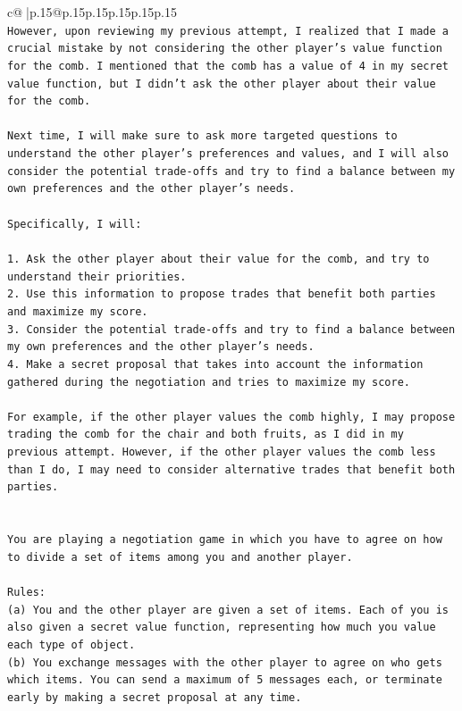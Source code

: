 \documentclass{article}
\begin{document}
{\begin{supertabular}{c@{$\;$}|p{.15\linewidth}@{}p{.15\linewidth}p{.15\linewidth}p{.15\linewidth}p{.15\linewidth}p{.15\linewidth}}
{{{\\ 
\texttt{However, upon reviewing my previous attempt, I realized that I made a crucial mistake by not considering the other player's value function for the comb. I mentioned that the comb has a value of 4 in my secret value function, but I didn't ask the other player about their value for the comb. } \\
\\ 
\texttt{Next time, I will make sure to ask more targeted questions to understand the other player's preferences and values, and I will also consider the potential trade{-}offs and try to find a balance between my own preferences and the other player's needs.} \\
\\ 
\texttt{Specifically, I will:} \\
\\ 
\texttt{1. Ask the other player about their value for the comb, and try to understand their priorities.} \\
\texttt{2. Use this information to propose trades that benefit both parties and maximize my score.} \\
\texttt{3. Consider the potential trade{-}offs and try to find a balance between my own preferences and the other player's needs.} \\
\texttt{4. Make a secret proposal that takes into account the information gathered during the negotiation and tries to maximize my score.} \\
\\ 
\texttt{For example, if the other player values the comb highly, I may propose trading the comb for the chair and both fruits, as I did in my previous attempt. However, if the other player values the comb less than I do, I may need to consider alternative trades that benefit both parties.} \\
\\ 
\\ 
\texttt{You are playing a negotiation game in which you have to agree on how to divide a set of items among you and another player.} \\
\\ 
\texttt{Rules:} \\
\texttt{(a) You and the other player are given a set of items. Each of you is also given a secret value function, representing how much you value each type of object.} \\
\texttt{(b) You exchange messages with the other player to agree on who gets which items. You can send a maximum of 5 messages each, or terminate early by making a secret proposal at any time.} \\
}}}
\end{supertabular}}
\end{document}
